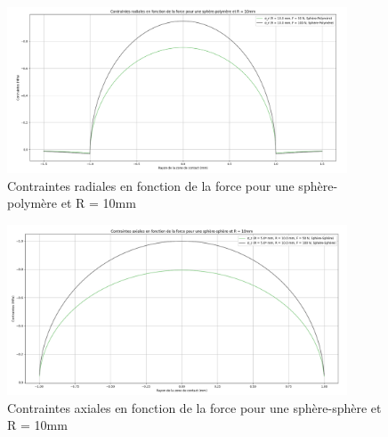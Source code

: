 \documentclass[a4paper,12pt]{article}
\begin{document}
\begin{figure}[H] %
	\centering
	\includegraphics[width=0.9\textwidth]{rad4.png} %
	\caption{Contraintes radiales en fonction de la force pour une sphère-polymère et R = 10mm} %
	\label{fig:mon_image8} %
\end{figure}
\clearpage
\begin{figure}[H] %
	\centering
	\includegraphics[width=0.9\textwidth]{ax3.png} %
	\caption{Contraintes axiales en fonction de la force pour une sphère-sphère et R = 10mm} %
	\label{fig:mon_image9} %
\end{figure}
\end{document}

